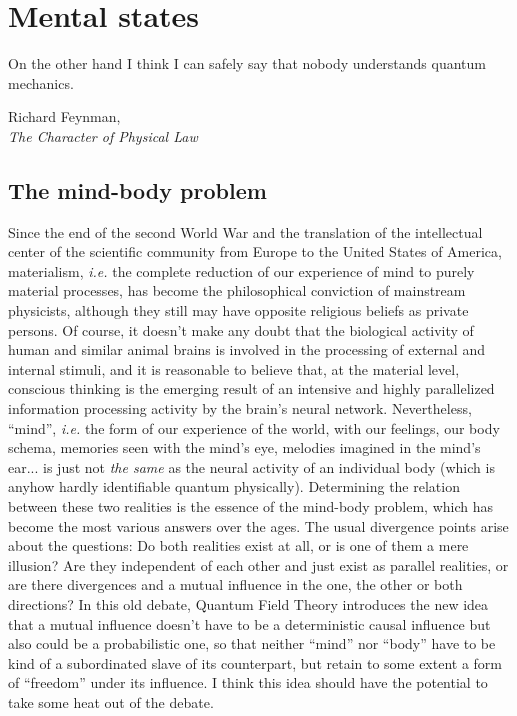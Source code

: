 \chapter{Mental states}
\label{Mental states}

\renewcommand{\epigraphwidth}{7cm}
\epigraph{On the other hand I think I can safely say that nobody understands quantum mechanics.}{Richard Feynman,\\\textit{The Character of Physical Law}~\cite{Feynman1964}}

\section{The mind-body problem}

Since the end of the second World War and the translation of the intellectual center of the scientific community from Europe to the United States of America, materialism, \textit{i.e.} the complete reduction of our experience of mind to purely material processes, has become the philosophical conviction of mainstream physicists, although they still may have opposite religious beliefs as private persons. Of course, it doesn't make any doubt that the biological activity of human and similar animal brains is involved in the processing of external and internal stimuli, and it is reasonable to believe that, at the material level, conscious thinking is the emerging result of an intensive and highly parallelized information processing activity by the brain's neural network. Nevertheless, ``mind'', \textit{i.e.} the form of our experience of the world, with our feelings, our body schema, memories seen with the mind's eye, melodies imagined in the mind's ear... is just not \textit{the same} as the neural activity of an individual body (which is anyhow hardly identifiable quantum physically). Determining the relation between these two realities is the essence of the mind-body problem, which has become the most various answers over the ages. The usual divergence points arise about the questions: Do both realities exist at all, or is one of them a mere illusion? Are they independent of each other and just exist as parallel realities, or are there divergences and a mutual influence in the one, the other or both directions? In this old debate, Quantum Field Theory introduces the new idea that a mutual influence doesn't have to be a deterministic causal influence but also could be a probabilistic one, so that neither ``mind'' nor ``body'' have to be kind of a subordinated slave of its counterpart, but retain to some extent a form of ``freedom'' under its influence. I think this idea should have the potential to take some heat out of the debate.

